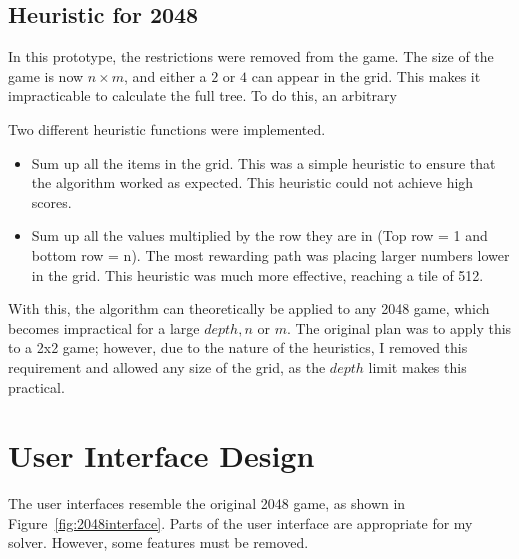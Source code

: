 \documentclass{article}
\begin{document}
\subsection{Heuristic for 2048}
\label{subsec:heuristic}
In this prototype, the restrictions were removed from the game. The size of the game is now $n \times m$, and either a $2$ or $4$ can appear in the grid. This makes it impracticable to calculate the full tree. To do this, an arbitrary  %

Two different heuristic functions were implemented.
\begin{itemize}
    \item Sum up all the items in the grid. This was a simple heuristic to ensure that the algorithm worked as expected. This heuristic could not achieve high scores.
    \item Sum up all the values multiplied by the row they are in (Top row = 1 and bottom row = n). The most rewarding path was placing larger numbers lower in the grid.  This heuristic was much more effective, reaching a tile of 512.
\end{itemize}

With this, the algorithm can theoretically be applied to any 2048 game, which becomes impractical for a large $depth, n$ or $m$. The original plan was to apply this to a 2x2 game; however, due to the nature of the heuristics, I removed this requirement and allowed any size of the grid, as the $depth$ limit makes this practical.
\section{User Interface Design}
\label{sec:ui}

The user interfaces resemble the original 2048 game, as shown in Figure~\ref{fig:2048interface}.
Parts of the user interface are appropriate for my solver. However, some features must be removed.
\end{document}

